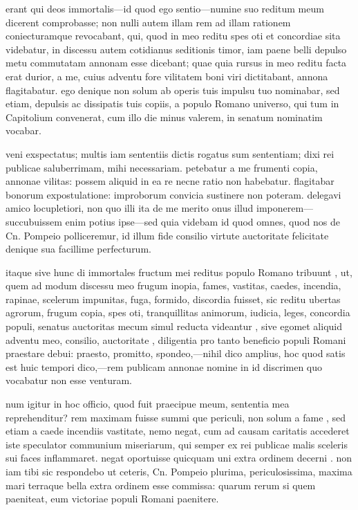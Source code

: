  erant qui deos immortalis—id quod ego sentio—numine suo reditum meum dicerent comprobasse; non nulli autem illam rem ad illam rationem coniecturamque revocabant, qui, quod in meo reditu spes oti et concordiae sita videbatur, in discessu autem cotidianus seditionis timor, iam paene belli depulso metu commutatam annonam esse dicebant; quae quia rursus in meo reditu facta erat durior, a me, cuius adventu fore vilitatem boni viri dictitabant, annona flagitabatur. ego denique non solum ab operis tuis impulsu tuo nominabar, sed etiam, depulsis ac dissipatis tuis copiis, a populo Romano universo, qui tum in Capitolium convenerat, cum illo die minus valerem, in senatum nominatim vocabar.

 veni exspectatus; multis iam sententiis dictis rogatus sum sententiam; dixi rei publicae saluberrimam, mihi necessariam. petebatur a me frumenti copia, annonae vilitas: possem aliquid in ea re necne ratio non habebatur. flagitabar bonorum expostulatione: improborum convicia sustinere non poteram. delegavi amico locupletiori, non quo illi ita de me merito onus illud imponerem—succubuissem enim potius ipse—sed quia videbam id quod omnes, quod nos de Cn. Pompeio polliceremur, id illum fide consilio virtute auctoritate felicitate denique sua facillime perfecturum.

 itaque sive hunc di immortales fructum mei reditus populo Romano tribuunt , ut, quem ad modum discessu meo frugum inopia, fames, vastitas, caedes, incendia, rapinae, scelerum impunitas, fuga, formido, discordia fuisset, sic reditu ubertas agrorum, frugum copia, spes oti, tranquillitas animorum, iudicia, leges, concordia populi, senatus auctoritas mecum simul reducta videantur , sive egomet aliquid adventu meo, consilio, auctoritate , diligentia pro tanto beneficio populi Romani praestare debui: praesto, promitto, spondeo,—nihil dico amplius, hoc quod satis est huic tempori dico,—rem publicam annonae nomine in id discrimen quo vocabatur non esse venturam.

 num igitur in hoc officio, quod fuit praecipue meum, sententia mea reprehenditur? rem maximam fuisse summi que periculi, non solum a fame , sed etiam a caede incendiis vastitate, nemo negat, cum ad causam caritatis accederet iste speculator communium miseriarum, qui semper ex rei publicae malis sceleris sui faces inflammaret. negat oportuisse quicquam uni extra ordinem decerni . non iam tibi sic respondebo ut ceteris, Cn. Pompeio plurima, periculosissima, maxima mari terraque bella extra ordinem esse commissa: quarum rerum si quem paeniteat, eum victoriae populi Romani paenitere.

